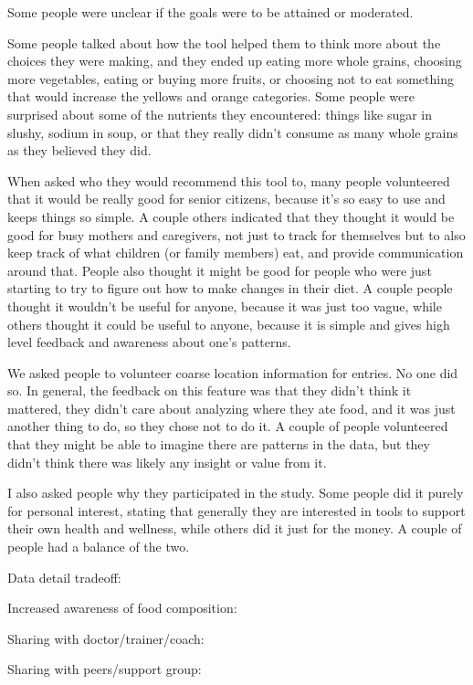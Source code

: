 Some people were unclear if the goals were to be attained or moderated. 

Some people talked about how the tool helped them to think more about the choices they were making, and they ended up eating more whole grains, choosing more vegetables, eating or buying more fruits, or choosing not to eat something that would increase the yellows and orange categories. Some people were surprised about some of the nutrients they encountered: things like sugar in slushy, sodium in soup, or that they really didn't consume as many whole grains as they believed they did. 

When asked who they would recommend this tool to, many people volunteered that it would be really good for senior citizens, because it's so easy to use and keeps things so simple. A couple others indicated that they thought it would be good for busy mothers and caregivers, not just to track for themselves but to also keep track of what children (or family members) eat, and provide communication around that. People also thought it might be good for people who were just starting to try to figure out how to make changes in their diet. A couple people thought it wouldn't be useful for anyone, because it was just too vague, while others thought it could be useful to anyone, because it is simple and gives high level feedback and awareness about one's patterns. 

We asked people to volunteer coarse location information for entries. No one did so. In general, the feedback on this feature was that they didn't think it mattered, they didn't care about analyzing where they ate food, and it was just another thing to do, so they chose not to do it. A couple of people volunteered that they might be able to imagine there are patterns in the data, but they didn't think there was likely any insight or value from it. 

I also asked people why they participated in the study. Some people did it purely for personal interest, stating that generally they are interested in tools to support their own health and wellness, while others did it just for the money. A couple of people had a balance of the two. 

Data detail tradeoff: 

\begin{itemize*}
\item Increased awareness of food composition: 
\item Sharing with doctor/trainer/coach: 
\item Sharing with peers/support group: 
\end{itemize*}

